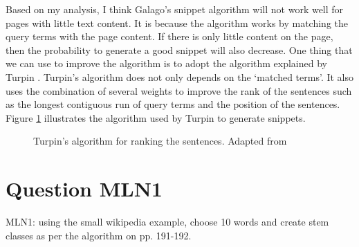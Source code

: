 \documentclass[letterpaper,11pt]{article}
\begin{document}
Based on my analysis, I think Galago's snippet algorithm will not work well for pages with little text content. It is because the algorithm works by matching the query terms with the page content. If there is only little content on the page, then the probability to generate a good snippet will also decrease. 
One thing that we can use to improve the algorithm is to adopt the algorithm explained by Turpin \cite{Turpin:2007:FGR:1277741.1277766}. Turpin's algorithm does not only depends on the `matched terms'. It also uses the combination of several weights to improve the rank of the sentences such as the longest contiguous run of query terms and the position of the sentences. Figure \ref{fig:sentence_rank} illustrates the algorithm used by Turpin \cite{Turpin:2007:FGR:1277741.1277766} to generate snippets. 

\begin{figure}[H]
	\centering
	\caption{Turpin's algorithm for ranking the sentences. Adapted from \cite{Turpin:2007:FGR:1277741.1277766}}
	\label{fig:sentence_rank}
\end{figure}

\noindent\makebox[\linewidth]{\rule{\textwidth}{0.4pt}}

\section*{Question MLN1}
\begin{spverbatim}
MLN1: using the small wikipedia example, choose 10 words and create stem classes as per the algorithm on pp. 191-192.
\end{spverbatim}
\end{document}
